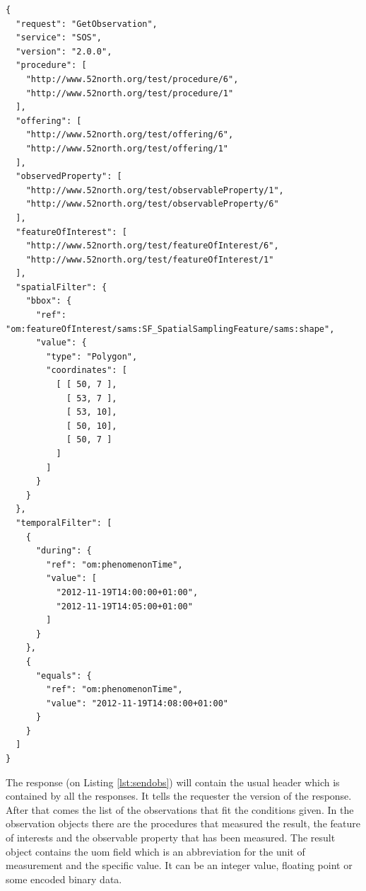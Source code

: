 \begin{lstlisting}[caption={JSON GetObservation POST request with all filters\label{lst:getobs}}]
{
  "request": "GetObservation",
  "service": "SOS",
  "version": "2.0.0",
  "procedure": [
    "http://www.52north.org/test/procedure/6",
    "http://www.52north.org/test/procedure/1"
  ],
  "offering": [
    "http://www.52north.org/test/offering/6",
    "http://www.52north.org/test/offering/1"
  ],
  "observedProperty": [
    "http://www.52north.org/test/observableProperty/1",
    "http://www.52north.org/test/observableProperty/6"
  ],
  "featureOfInterest": [
    "http://www.52north.org/test/featureOfInterest/6",
    "http://www.52north.org/test/featureOfInterest/1"
  ],
  "spatialFilter": {
    "bbox": {
      "ref": "om:featureOfInterest/sams:SF_SpatialSamplingFeature/sams:shape",
      "value": {
        "type": "Polygon",
        "coordinates": [
          [ [ 50, 7 ],
            [ 53, 7 ],
            [ 53, 10],
            [ 50, 10],
            [ 50, 7 ]
          ]
        ]
      }
    }
  },
  "temporalFilter": [
    {
      "during": {
        "ref": "om:phenomenonTime",
        "value": [
          "2012-11-19T14:00:00+01:00",
          "2012-11-19T14:05:00+01:00"
        ]
      }
    },
    { 
      "equals": {
        "ref": "om:phenomenonTime",
        "value": "2012-11-19T14:08:00+01:00"
      }
    }
  ]
}
\end{lstlisting}

The response (on Listing \ref{lst:sendobs}) will contain the usual header which is contained by all the responses. It tells the requester the version of the response. After that comes the list of the observations that fit the conditions given. In the observation objects there are the procedures that measured the result, the feature of interests and the observable property that has been measured. The result object contains the uom field which is an abbreviation for the unit of measurement and the specific value. It can be an integer value, floating point or some encoded binary data.

